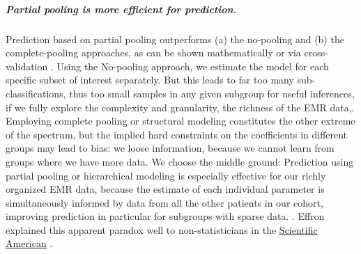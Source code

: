 \documentclass[11pt,notitlepage]{article}
\begin{document}
\subparagraph*{Partial pooling is more efficient for prediction.}
Prediction based on partial pooling outperforms (a) the no-pooling and (b) the complete-pooling approaches, as can be shown mathematically \cite{Efron_1975} or via cross-validation \cite{Gelman-Hill_2014}.  Using the No-pooling approach, we estimate the model for each specific subset of interest separately. But this leads to far too many sub-classifications, thus too small samples in any given subgroup for useful inferences, if we fully explore the complexity and granularity, the richness of the EMR data,. Employing complete pooling or structural modeling constitutes the other extreme of the spectrum, but the implied hard constraints on the coefficients in different groups may lead to bias: we loose information, because we cannot learn from groups where we have more data. We choose the middle ground: Prediction using partial pooling or hierarchical modeling is especially effective for our richly organized EMR data, because the estimate of each individual parameter is simultaneously informed by data from all the other patients in our cohort, improving prediction in particular for subgroups with sparse data. \cite{Gelman_multilevel_2006}. Effron explained this apparent paradox well to non-statisticians in the \href{http://www.nature.com/scientificamerican/journal/v236/n5/pdf/scientificamerican0577-119.pdf}{Scientific American} \cite{Stein_paradox_Scientific_American,Efron_Stein_1977}. 
\vspace{3pt}
\end{document}
